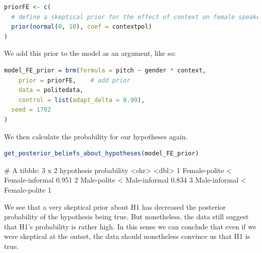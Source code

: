 \documentclass[nobib]{tufte-handout}
\begin{document}
\bigskip

\begin{minipage}[]{1\textwidth}
\begin{lstlisting}[language=R]
priorFE <- c(
  # define a skeptical prior for the effect of context on female speakers
  prior(normal(0, 10), coef = contextpol)
)
\end{lstlisting}
\end{minipage}

We add this prior to the model as an argument, like so:

\bigskip

\begin{minipage}[]{1\textwidth}
\begin{lstlisting}[language=R]
model_FE_prior = brm(formula = pitch ~ gender * context,
	prior = priorFE, 	# add prior 
	data = politedata,
	control = list(adapt_delta = 0.99),
  seed = 1702
)    
\end{lstlisting}
\end{minipage}

We then calculate the probability for our hypotheses again. 

\medskip

\begin{minipage}[]{1\textwidth}
\begin{lstlisting}[language=R]
get_posterior_beliefs_about_hypotheses(model_FE_prior)
\end{lstlisting}
\end{minipage}

\begin{minipage}[]{\textwidth}
\begin{rc}
# A tibble: 3 x 2
  hypothesis                      probability
  <chr>                                 <dbl>
1 Female-polite < Female-informal       0.951
2 Male-polite < Male-informal           0.834
3 Male-informal < Female-polite         1   
\end{rc}
\end{minipage}

\noindent We see that a very skeptical prior about H1 has decreased the posterior probability
of the hypothesis being true. But nonetheless, the data still suggest that H1's probability is
rather high. In this sense we can conclude that even if we were skeptical at the outset, the
data should nonetheless convince us that H1 is true.
\end{document}
